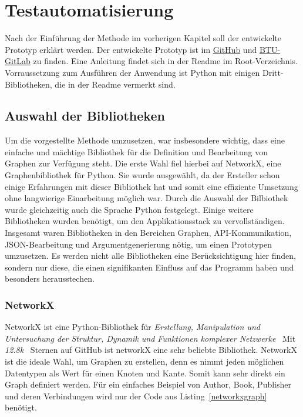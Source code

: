 \chapter{Testautomatisierung}
\label{testautomatisierung}

Nach der Einführung der Methode im vorherigen Kapitel soll der entwickelte Prototyp erklärt werden.
Der entwickelte Prototyp ist im \href{https://github.com/gernhard1337/graphql-primepath-tester}{GitHub} und \href{https://git.informatik.tu-cottbus.de/sst/abschlussarbeiten/master/lorenz_tom/graphql-tester-prototyp}{BTU-GitLab} zu finden.
Eine Anleitung findet sich in der Readme im Root-Verzeichnis.
Vorraussetzung zum Ausführen der Anwendung ist Python mit einigen Dritt-Bibliotheken, die in der Readme vermerkt sind.

\section{Auswahl der Bibliotheken}

Um die vorgestellte Methode umzusetzen, war insbesondere wichtig, dass eine einfache und mächtige Bibliothek für die Definition und Bearbeitung von Graphen zur Verfügung steht.
Die erste Wahl fiel hierbei auf NetworkX, eine Graphenbibliothek für Python.
Sie wurde ausgewählt, da der Ersteller schon einige Erfahrungen mit dieser Bibliothek hat und somit eine effiziente Umsetzung ohne langwierige Einarbeitung möglich war.
Durch die Auswahl der Bilbiothek wurde gleichzeitig auch die Sprache Python festgelegt.
Einige weitere Bibliotheken wurden benötigt, um den Applikationsstack zu vervollständigen.
Insgesamt waren Bibliotheken in den Bereichen Graphen, API-Kommunikation, JSON-Bearbeitung und Argumentgenerierung nötig, um einen Prototypen umzusetzen.
Es werden nicht alle Bibliotheken eine Berücksichtigung hier finden, sondern nur diese, die einen signifikanten Einfluss auf das Programm haben und besonders herausstechen.

\subsection{NetworkX}

NetworkX ist eine Python-Bibliothek für \textit{Erstellung, Manipulation und Untersuchung der Struktur, Dynamik und Funktionen komplexer Netzwerke}~\cite[vgl. Startseite]{networkx}
Mit \textit{12.8k}~\cite{networkxgithub} Sternen auf GitHub ist networkX eine sehr beliebte Bibliothek.
NetworkX ist die ideale Wahl, um Graphen zu erstellen, denn es nimmt jeden möglichen Datentypen als Wert für einen Knoten und Kante.
Somit kann sehr direkt ein Graph definiert werden.
Für ein einfaches Beispiel von Author, Book, Publisher und deren Verbindungen wird nur der Code aus Listing~\ref{networkxgraph} benötigt.

